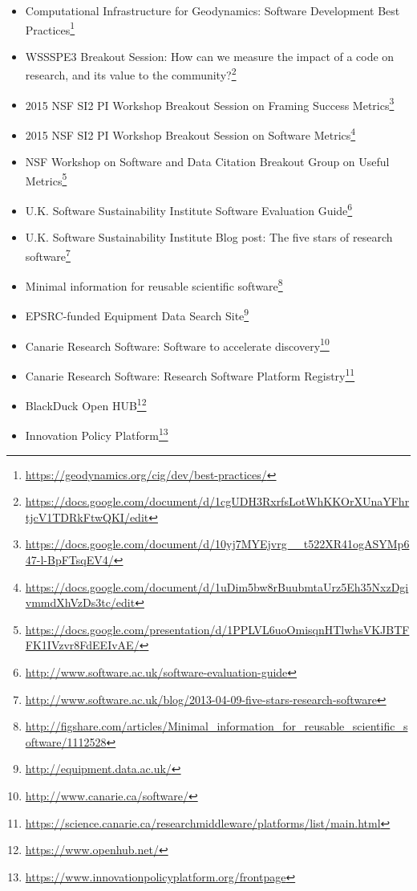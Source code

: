 \begin{itemize}

\item
Computational Infrastructure for Geodynamics: Software Development Best Practices\footnote{\url{https://geodynamics.org/cig/dev/best-practices/}}

\item
WSSSPE3 Breakout Session: How can we measure the impact of a code on research, and its value to the community?\footnote{\url{https://docs.google.com/document/d/1cgUDH3RxrfsLotWhKKOrXUnaYFhrtjcV1TDRkFtwQKI/edit}}

\item
2015 NSF SI2 PI Workshop Breakout Session on Framing Success Metrics\footnote{\url{https://docs.google.com/document/d/10yj7MYEjvrg__t522XR41ogASYMp647-l-BpFTsqEV4/}}

\item
2015 NSF SI2 PI Workshop Breakout Session on Software Metrics\footnote{\url{https://docs.google.com/document/d/1uDim5bw8rBuubmtaUrz5Eh35NxzDgivmmdXhVzDs3tc/edit}}

\item
NSF Workshop on Software and Data Citation Breakout Group on Useful Metrics\footnote{\url{https://docs.google.com/presentation/d/1PPLVL6uoOmisqnHTlwhsVKJBTFFK1IVzvr8FdEEIvAE/}}

\item
U.K. Software Sustainability Institute Software Evaluation Guide\footnote{\url{http://www.software.ac.uk/software-evaluation-guide}}

\item
U.K. Software Sustainability Institute Blog post: The five stars of research software\footnote{\url{http://www.software.ac.uk/blog/2013-04-09-five-stars-research-software}}

\item
Minimal information for reusable scientific software\footnote{\url{http://figshare.com/articles/Minimal_information_for_reusable_scientific_software/1112528}}

\item
EPSRC-funded Equipment Data Search Site\footnote{\url{http://equipment.data.ac.uk/}}

\item
Canarie Research Software: Software to accelerate discovery\footnote{\url{http://www.canarie.ca/software/}}

\item
Canarie Research Software: Research Software Platform Registry\footnote{\url{https://science.canarie.ca/researchmiddleware/platforms/list/main.html}}

\item
BlackDuck Open HUB\footnote{\url{https://www.openhub.net/}}

\item
Innovation Policy Platform\footnote{\url{https://www.innovationpolicyplatform.org/frontpage}}


\end{itemize}


